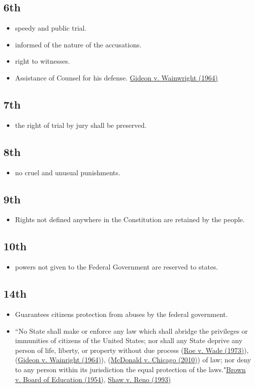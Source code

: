\documentclass[12pt]{article}
\begin{document}
\subsection*{6th}
	\begin{itemize}
		\item speedy and public trial.
		\item informed of the nature of the accusations.
		\item right to witnesses.
		\item Assistance of Counsel for his defense. \hyperlink{Gideon}{Gideon v. Wainwright (1964)}
	\end{itemize}
\subsection*{7th}
	\begin{itemize}
		\item the right of trial by jury shall be preserved.
	\end{itemize}

\subsection*{8th}
	\begin{itemize}
		\item no cruel and unusual punishments.
	\end{itemize}

\subsection*{9th}
	\begin{itemize}
		\item Rights not defined anywhere in the Constitution are retained by the people.
	\end{itemize}

\subsection*{10th}
	\begin{itemize}
		\item powers not given to the Federal Government are reserved to states.
	\end{itemize}
\subsection*{14th}
	\begin{itemize}
		\item Guarantees citizens protection from abuses by the federal government.
		\item ``No State shall make or enforce any law which shall abridge the privileges or immunities of citizens of the United States;
			nor shall any State deprive any person of life, liberty, or property without due process (\hyperlink{Roe}{Roe v. Wade (1973)}), (\hyperlink{Gideon}{Gideon v. Wainright (1964)}), (\hyperlink{McDonald}{McDonald v. Chicago (2010)}) of law;
			nor deny to any person within its jurisdiction the equal protection of the laws."\hyperlink{Brown}{Brown v. Board of Education (1954)}, \hyperlink{Shaw}{Shaw v. Reno (1993)}
	\end{itemize}
\end{document}
